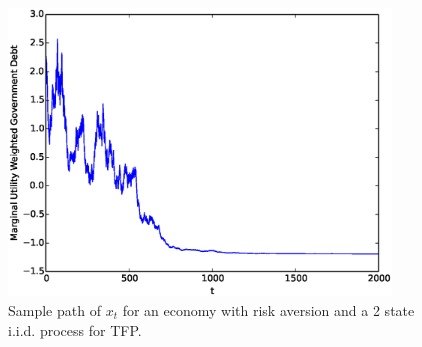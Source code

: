 \documentclass[12pt]{article}
\newcommand{\tjs}[1]{\textcolor{red}{$^{\textrm{tjs}}${#1}}}
\begin{document}
\begin{figure}[ht]
	\begin{center}
	\includegraphics[width=4in]{Images/2stateiid.eps}
\caption{Sample path of $x_t$  for an economy with risk aversion and a 2 state i.i.d. process for TFP.\label{fig:conv_RA}}
	\end{center}
\end{figure}



% 
% 
% 
\end{document}
